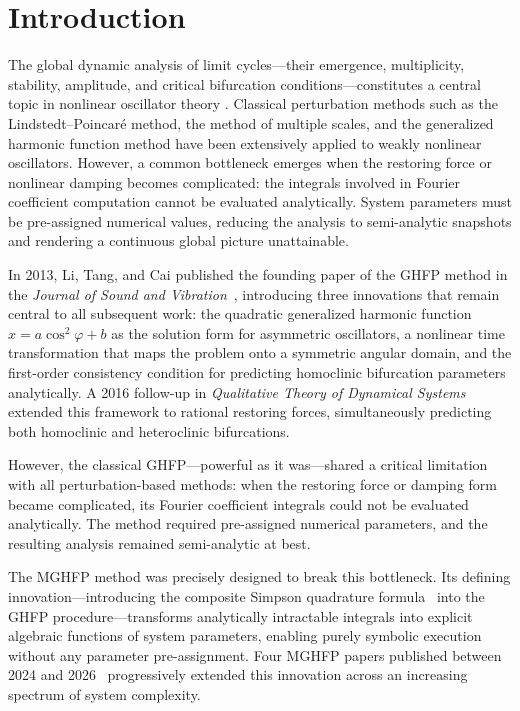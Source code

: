 \documentclass[11pt,a4paper]{article}
\begin{document}
\section{Introduction}

The global dynamic analysis of limit cycles---their emergence, multiplicity, stability, amplitude, and critical bifurcation conditions---constitutes a central topic in nonlinear oscillator theory \cite{Nayfeh2008,Mickens2010}. Classical perturbation methods such as the Lindstedt--Poincar\'e method, the method of multiple scales, and the generalized harmonic function method \cite{Xu1994} have been extensively applied to weakly nonlinear oscillators. However, a common bottleneck emerges when the restoring force or nonlinear damping becomes complicated: the integrals involved in Fourier coefficient computation cannot be evaluated analytically. System parameters must be pre-assigned numerical values, reducing the analysis to semi-analytic snapshots and rendering a continuous global picture unattainable.

In 2013, Li, Tang, and Cai published the founding paper of the GHFP method in the \textit{Journal of Sound and Vibration}~\cite{P5}, introducing three innovations that remain central to all subsequent work: the quadratic generalized harmonic function $x = a\cos^2\varphi + b$ as the solution form for asymmetric oscillators, a nonlinear time transformation that maps the problem onto a symmetric angular domain, and the first-order consistency condition for predicting homoclinic bifurcation parameters analytically. A 2016 follow-up in \textit{Qualitative Theory of Dynamical Systems}~\cite{P6} extended this framework to rational restoring forces, simultaneously predicting both homoclinic and heteroclinic bifurcations.

However, the classical GHFP---powerful as it was---shared a critical limitation with all perturbation-based methods: when the restoring force or damping form became complicated, its Fourier coefficient integrals could not be evaluated analytically. The method required pre-assigned numerical parameters, and the resulting analysis remained semi-analytic at best.

The MGHFP method was precisely designed to break this bottleneck. Its defining innovation---introducing the composite Simpson quadrature formula~\cite{Davis2007} into the GHFP procedure---transforms analytically intractable integrals into explicit algebraic functions of system parameters, enabling purely symbolic execution without any parameter pre-assignment. Four MGHFP papers published between 2024 and 2026~\cite{P1,P2,P3,P4} progressively extended this innovation across an increasing spectrum of system complexity.
\end{document}
